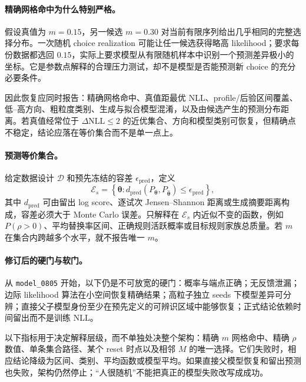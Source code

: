 \paragraph{精确网格命中为什么特别严格。}
假设真值为 $m=0.15$，另一候选 $m=0.30$ 对当前有限序列给出几乎相同的完整选择分布。一次随机 choice realization 可能让任一候选获得略高 likelihood；要求每份数据都选回 $0.15$，实际上要求模型从有限随机样本中识别一个预测差异极小的坐标。它是参数点解释的合理压力测试，却不是模型是否能预测新 choice 的充分必要条件。

因此恢复应同时报告：精确网格命中、真值距最优 NLL、profile/后验区间覆盖、低--高方向、粗粒度类别、生成与拟合模型混淆，以及由候选产生的预测分布距离。若真值经常位于 $\Delta\mathrm{NLL}\leq2$ 的近优集合、方向和模型类别可恢复，但精确点不稳定，结论应落在等价集合而不是单一点上。

\paragraph{预测等价集合。}
给定数据设计 $\mathcal D$ 和预先冻结的容差 $\epsilon_{\mathrm{pred}}$，定义
\begin{equation}
    \mathcal E_s
    =\left\{\boldsymbol\theta:
      d_{\mathrm{pred}}
      (P_{\boldsymbol\theta},P_{\widehat{\boldsymbol\theta}})
      \leq\epsilon_{\mathrm{pred}}
      \right\},
    \label{eq:model0805-equivalence-set}
\end{equation}
其中 $d_{\mathrm{pred}}$ 可由留出 log score、逐试次 Jensen--Shannon 距离或生成摘要距离构成，容差必须大于 Monte Carlo 误差。只解释在 $\mathcal E_s$ 内近似不变的函数，例如 $P(\rho>0)$、平均替换率区间、正确规则活跃概率或目标规则家族总质量。若 $m$ 在集合内跨越多个水平，就不报告唯一 $m$。

\paragraph{修订后的硬门与软门。}
从 \texttt{model\_0805} 开始，以下仍是不可放宽的硬门：概率与端点正确；无反馈泄漏；边际 likelihood 算法在小空间恢复精确结果；高粒子独立 seeds 下模型差异可分辨；直接父子模型身份至少在预先定义的可辨识区域中能够恢复；正式结论依赖时间留出而不是训练 NLL。

以下指标用于决定解释层级，而不单独处决整个架构：精确 $m$ 网格命中、精确 $\rho$ 数值、单条集合路径、某个 reset 时点以及相邻 $M$ 的唯一选择。它们失败时，相应结论降级为区间、类别、平均函数或模型平均。如果直接父模型恢复和留出预测也失败，架构仍然停止；“人很随机”不能把真正的模型失败改写成成功。


